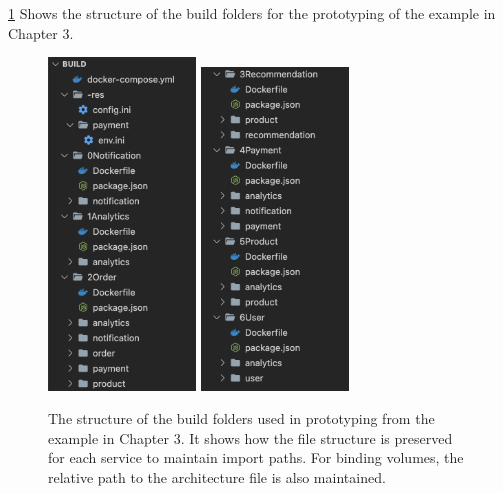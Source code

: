\cref{figure:buildfolder_structure} Shows the structure of the build folders for the prototyping of the example in Chapter 3.  

\begin{figure}[t]
    \center
    \includegraphics[width=0.35\textwidth]{figures/bf_p1.png}
    \includegraphics[width=0.35\textwidth]{figures/bf_p2.png}
    \caption{The structure of the build folders used in prototyping from the example in Chapter 3. It shows how the file structure is preserved for each service to maintain import paths. For binding volumes, the relative path to the architecture file is also maintained.}
    \label{figure:buildfolder_structure}
\end{figure}